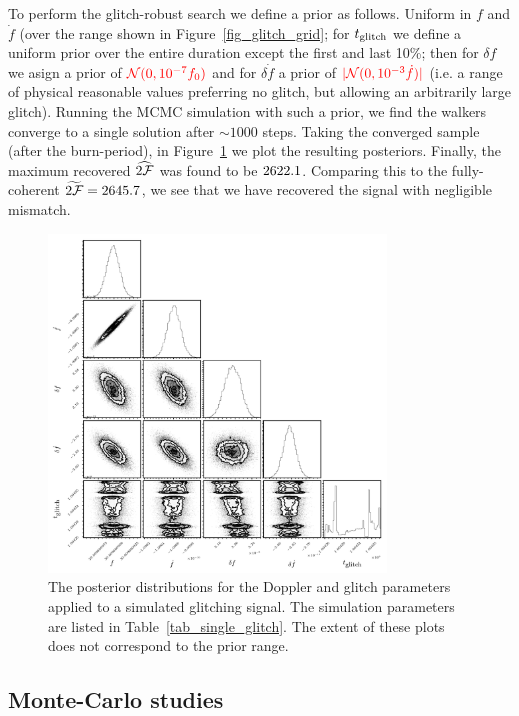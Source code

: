 \documentclass[aps, prd, twocolumn, superscriptaddress, floatfix, showpacs, nofootinbib, longbibliography]{revtex4-1}
\newcommand{\CHECK}[1]{\textcolor{red}{#1}}
\begin{document}
To perform the glitch-robust search we define a prior as follows. Uniform in
$f$ and $\dot{f}$ (over the range shown in Figure~\ref{fig_glitch_grid}; for
$t_{\rm glitch}$ we define a uniform prior over the entire duration except the first
and last 10\%; then for $\delta f$ we asign a prior of $\CHECK{\mathcal{N}(0,
10^{-7} f_0)}$ and for $\delta\dot{f}$ a prior of $\CHECK{|\mathcal{N}(0,
10^{-3}\dot{f})|}$ (i.e. a range of physical reasonable values preferring no
glitch, but allowing an arbitrarily large glitch). Running the MCMC simulation
with such a prior, we find the walkers converge to a single solution after
$\sim 1000$ steps. Taking the converged sample (after the burn-period), in
Figure~\ref{fig_glitch_posteriors} we plot the resulting posteriors. Finally,
the maximum recovered $\widehat{2{\mathcal{F}}}$ was found to be $2622.1$.
Comparing this to the fully-coherent $\widetilde{2{\mathcal{F}}}=2645.7$, we see
that we have recovered the signal with negligible mismatch.

\begin{figure}[htb]
\centering
\includegraphics[width=0.8\textwidth]{single_glitch_glitchSearch_corner}
\caption{The posterior distributions for the Doppler and glitch parameters
applied to a simulated glitching signal. The simulation parameters are listed
in Table~\ref{tab_single_glitch}. The extent of these plots does not correspond
to the prior range.}
\label{fig_glitch_posteriors}
\end{figure}

\subsection{Monte-Carlo studies}
\label{sec_MCS_glitch}
\end{document}
